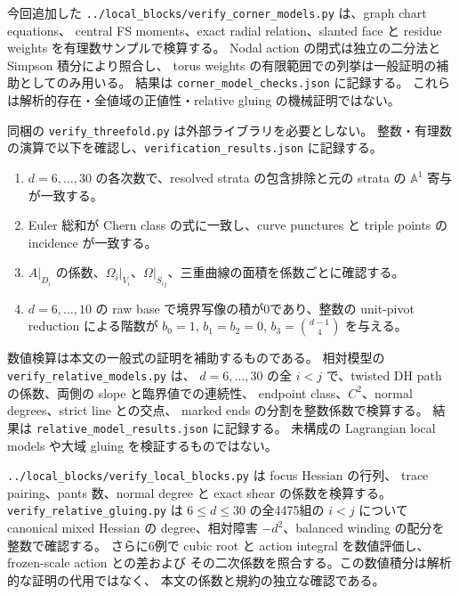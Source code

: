 \documentclass[11pt,a4paper]{article}
\theoremstyle{definition}
\begin{document}
今回追加した \texttt{../local\_blocks/verify\_corner\_models.py} は、graph chart equations、
central FS moments、exact radial relation、slanted face と residue weights を有理数サンプルで検算する。
Nodal action の閉式は独立の二分法と Simpson 積分により照合し、
torus weights の有限範囲での列挙は一般証明の補助としてのみ用いる。
結果は \texttt{corner\_model\_checks.json} に記録する。
これらは解析的存在・全値域の正値性・relative gluing の機械証明ではない。

同梱の \texttt{verify\_threefold.py} は外部ライブラリを必要としない。
整数・有理数の演算で以下を確認し、\texttt{verification\_results.json} に記録する。
\begin{enumerate}
\item $d=6,\ldots,30$ の各次数で、resolved strata の包含排除と元の strata の $\mathbb A^1$ 寄与が一致する。
\item Euler 総和が Chern class の式に一致し、curve punctures と triple points の incidence が一致する。
\item $A|_{D_i}$ の係数、$\Omega_i|_{V_i}$、$\Omega|_{S_{ij}}$、三重曲線の面積を係数ごとに確認する。
\item $d=6,\ldots,10$ の raw base で境界写像の積が0であり、整数の unit-pivot reduction による階数が
$b_0=1$, $b_1=b_2=0$, $b_3=\binom{d-1}{4}$ を与える。
\end{enumerate}
数値検算は本文の一般式の証明を補助するものである。
相対模型の \texttt{verify\_relative\_models.py} は、
$d=6,\ldots,30$ の全 $i<j$ で、twisted DH path の係数、両側の slope と臨界値での連続性、
endpoint class、$C^2$、normal degrees、strict line との交点、
marked ends の分割を整数係数で検算する。
結果は \texttt{relative\_model\_results.json} に記録する。
未構成の Lagrangian local models や大域 gluing を検証するものではない。

\texttt{../local\_blocks/verify\_local\_blocks.py} は focus Hessian の行列、
trace pairing、pants 数、normal degree と exact shear の係数を検算する。
\texttt{verify\_relative\_gluing.py} は $6\le d\le30$ の全4475組の $i<j$ について
canonical mixed Hessian の degree、相対障害 $-d^2$、balanced winding の配分を整数で確認する。
さらに6例で cubic root と action integral を数値評価し、frozen-scale action との差および
その二次係数を照合する。この数値積分は解析的な証明の代用ではなく、
本文の係数と規約の独立な確認である。
\end{document}
